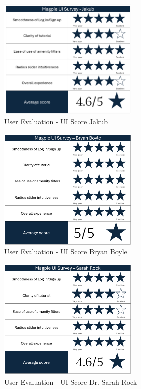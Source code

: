 \begin{figure}[h!]
    \centering
    \includegraphics[width=0.6\textwidth]{images/survey-jakub.png}
    \caption{User Evaluation - UI Score Jakub}
    \label{fig:jakubscore}
\end{figure}
\begin{figure}[h!]
    \centering
    \includegraphics[width=0.6\textwidth]{images/survey-bryan.png}
    \caption{User Evaluation - UI Score Bryan Boyle}
    \label{fig:bryanscore}
\end{figure}
\begin{figure}[h!]
    \centering
    \includegraphics[width=0.6\textwidth]{images/survey-sarah.png}
    \caption{User Evaluation - UI Score Dr. Sarah Rock}
    \label{fig:sarahscore}
\end{figure}
